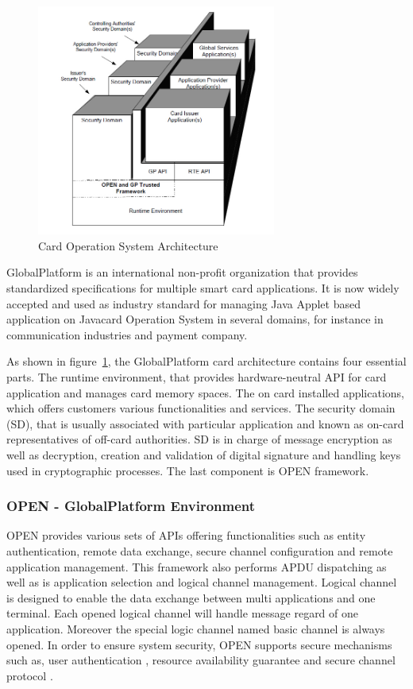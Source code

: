 \documentclass[]{llncs}
\begin{document}
\begin{figure}[!htbp]
	\centering
	\includegraphics[width=0.7\textwidth]{gp_1.jpg}
		\caption[ ]{Card Operation System Architecture\cite{gp}}
	\label{fig:gp_1}
\end{figure}
GlobalPlatform is an international non-profit organization that provides standardized specifications for multiple smart card applications. It is now widely accepted and used as industry standard for managing Java Applet based application on Javacard Operation System in several domains, for instance in communication industries and payment company\cite{gp}. 

As shown in figure~\ref{fig:gp_1},  the GlobalPlatform card architecture contains four essential parts. The runtime environment, that provides hardware-neutral API for card application  and manages card memory spaces. The on card installed applications, which offers customers various functionalities and services. The security domain (SD), that is usually associated with particular application and known as on-card representatives  of off-card  authorities. SD is in charge of message encryption as well as decryption, creation and validation of digital signature and handling keys used in cryptographic processes. The last component is OPEN framework\cite{gp}.

\subsubsection{OPEN - GlobalPlatform Environment}
OPEN provides various sets of APIs offering functionalities such as entity authentication, remote data exchange, secure channel configuration and remote application management. This framework also performs APDU dispatching as well as is application selection and logical channel management\cite{gp}. Logical channel is designed to enable the data exchange between multi applications and one terminal. Each opened logical channel will handle message regard of one application.  Moreover the special logic channel named basic channel is always opened. In order to ensure system security, OPEN supports secure mechanisms such as,  user authentication , resource availability guarantee and secure channel protocol .
\end{document}
